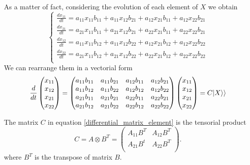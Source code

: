 As a matter of fact, considering the evolution of each element of $X$ we obtain
\begin{equation}
    \left\{\begin{aligned}
        \frac{dx_{11}}{dt} = a_{11}x_{11}b_{11} +a_{11}x_{12}b_{21}+ a_{12}x_{21}b_{11}+ a_{12}x_{22}b_{21}\\
        \frac{dx_{21}}{dt} = a_{21}x_{11}b_{11} +a_{21}x_{12}b_{21}+ a_{22}x_{21}b_{11}+ a_{22}x_{22}b_{21}\\
        \frac{dx_{12}}{dt} = a_{11}x_{11}b_{12} +a_{11}x_{12}b_{22}+ a_{12}x_{21}b_{12}+ a_{12}x_{22}b_{22}\\
        \frac{dx_{22}}{dt} = a_{21}x_{11}b_{12} +a_{21}x_{12}b_{22}+ a_{22}x_{21}b_{12}+ a_{22}x_{22}b_{22}\\
    \end{aligned}\right. 
\end{equation}
We can rearrange them in a vectorial form
\begin{equation}\label{differential_matrix_element}
    \frac{d}{dt}\begin{pmatrix}
        x_{11}\\ x_{12}\\x_{21}\\ x_{22}\\
    \end{pmatrix} = \begin{pmatrix}
        a_{11}b_{11} &a_{11}b_{21}& a_{12}b_{11}& a_{12}b_{21}\\
        a_{11}b_{12} &a_{11}b_{22}& a_{12}b_{12}& a_{12}b_{22}\\
        a_{21}b_{11} &a_{21}b_{21}& a_{22}b_{11}& a_{22}b_{21}\\
        a_{21}b_{12} &a_{21}b_{22}& a_{22}b_{12}& a_{22}b_{22}\\
    \end{pmatrix}\begin{pmatrix}
        x_{11}\\ x_{12}\\ x_{21}\\ x_{22}\\
    \end{pmatrix} = C \lvert X\rangle\rangle
\end{equation}

The matrix $C$ in equation \eqref{differential_matrix_element} is the tensorial product
\begin{equation}
    C= A\otimes B^T = \begin{pmatrix}
        A_{11}B^T & A_{12}B^T\\
        A_{21}B^t& A_{22}B^T\\
    \end{pmatrix}.
\end{equation}
where $B^T$ is the transpose of matrix $B$.

